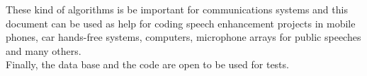 These kind of algorithms is be important for communications systems and this document can be used as help for coding speech enhancement projects in mobile phones, car hands-free systems, computers, microphone arrays for public speeches and many others. \\

Finally, the data base and the code are open to be used for tests. 
















